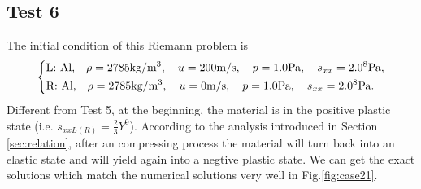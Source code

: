 \documentclass[review]{elsarticle}
\numberwithin{equation}{section}
\numberwithin{table}{section}
\begin{document}
\subsection{Test 6}
The initial condition of this Riemann problem is
\begin{equation}
 \left\{ \begin{aligned}
	 &	 \text{L: Al,}\quad  \rho = 2785 \text{kg}/\text{m}^3, \quad  u = 200\text{m}/\text{s}, \quad  p = 1.0 \text{Pa}, \quad  s_{xx}=2.0\time 10^8 \text{Pa},\\
	 &	 \text{R: Al,}\quad  \rho = 2785 \text{kg}/\text{m}^3, \quad  u = 0\text{m}/\text{s}, \quad  p = 1.0\text{Pa}, \quad  s_{xx}= 2.0 \time 10^8 \text{Pa}.\\
   \end{aligned}
 \right.
\end{equation}
Different from Test 5, at the beginning, the material is in the positive  plastic state (i.e. $s_{xxL(R)}=\frac{2}{3}{Y}^{0}$). According to the analysis introduced in Section \ref{sec:relation}, after an compressing  process the material will turn back into an elastic state and will yield again into a negtive plastic state. We can get the exact  solutions which match the numerical solutions very well in Fig.\ref{fig:case21}.
\end{document}
